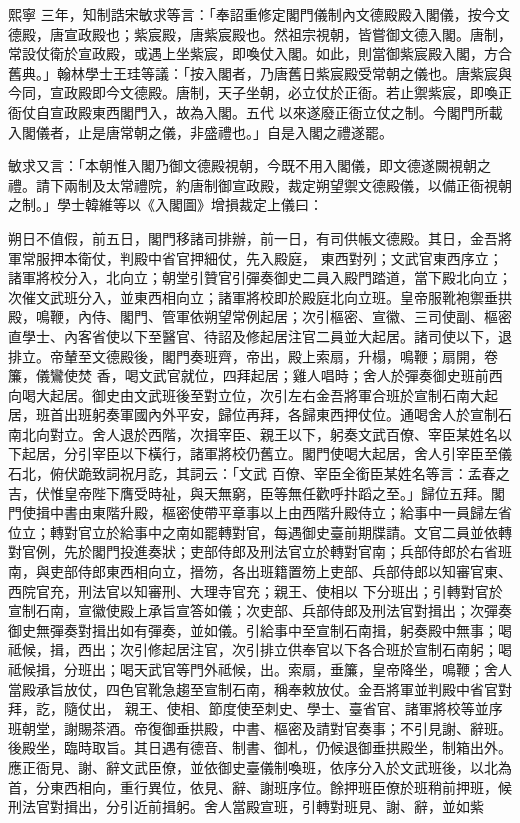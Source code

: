 \begin{pinyinscope}
 熙寧
 三年，知制誥宋敏求等言：「奉詔重修定閣門儀制內文德殿殿入閣儀，按今文德殿，唐宣政殿也；紫宸殿，唐紫宸殿也。然祖宗視朝，皆嘗御文德入閣。唐制，常設仗衛於宣政殿，或遇上坐紫宸，即喚仗入閣。如此，則當御紫宸殿入閣，方合舊典。」翰林學士王珪等議：「按入閣者，乃唐舊日紫宸殿受常朝之儀也。唐紫宸與今同，宣政殿即今文德殿。唐制，天子坐朝，必立仗於正衙。若止禦紫宸，即喚正衙仗自宣政殿東西閣門入，故為入閣。五代
 以來遂廢正衙立仗之制。今閣門所載入閣儀者，止是唐常朝之儀，非盛禮也。」自是入閣之禮遂罷。



 敏求又言：「本朝惟入閣乃御文德殿視朝，今既不用入閣儀，即文德遂闕視朝之禮。請下兩制及太常禮院，約唐制御宣政殿，裁定朔望禦文德殿儀，以備正衙視朝之制。」學士韓維等以《入閣圖》增損裁定上儀曰：



 朔日不值假，前五日，閣門移諸司排辦，前一日，有司供帳文德殿。其日，金吾將軍常服押本衛仗，判殿中省官押細仗，先入殿庭，
 東西對列；文武官東西序立；諸軍將校分入，北向立；朝堂引贊官引彈奏御史二員入殿門踏道，當下殿北向立；次催文武班分入，並東西相向立；諸軍將校即於殿庭北向立班。皇帝服靴袍禦垂拱殿，鳴鞭，內侍、閣門、管軍依朔望常例起居；次引樞密、宣徽、三司使副、樞密直學士、內客省使以下至醫官、待詔及修起居注官二員並大起居。諸司使以下，退排立。帝輦至文德殿後，閣門奏班齊，帝出，殿上索扇，升榻，鳴鞭；扇開，卷簾，儀鸞使焚
 香，喝文武官就位，四拜起居；雞人唱時；舍人於彈奏御史班前西向喝大起居。御史由文武班後至對立位，次引左右金吾將軍合班於宣制石南大起居，班首出班躬奏軍國內外平安，歸位再拜，各歸東西押仗位。通喝舍人於宣制石南北向對立。舍人退於西階，次揖宰臣、親王以下，躬奏文武百僚、宰臣某姓名以下起居，分引宰臣以下橫行，諸軍將校仍舊立。閣門使喝大起居，舍人引宰臣至儀石北，俯伏跪致詞祝月訖，其詞云：「文武
 百僚、宰臣全銜臣某姓名等言：孟春之吉，伏惟皇帝陛下膺受時祉，與天無窮，臣等無任歡呼抃蹈之至。」歸位五拜。閣門使揖中書由東階升殿，樞密使帶平章事以上由西階升殿侍立；給事中一員歸左省位立；轉對官立於給事中之南如罷轉對官，每遇御史臺前期牒請。文官二員並依轉對官例，先於閣門投進奏狀；吏部侍郎及刑法官立於轉對官南；兵部侍郎於右省班南，與吏部侍郎東西相向立，搢笏，各出班籍置笏上吏部、兵部侍郎以知審官東、西院官充，刑法官以知審刑、大理寺官充；親王、使相以
 下分班出；引轉對官於宣制石南，宣徽使殿上承旨宣答如儀；次吏部、兵部侍郎及刑法官對揖出；次彈奏御史無彈奏對揖出如有彈奏，並如儀。引給事中至宣制石南揖，躬奏殿中無事；喝祗候，揖，西出；次引修起居注官，次引排立供奉官以下各合班於宣制石南躬；喝祗候揖，分班出；喝天武官等門外祗候，出。索扇，垂簾，皇帝降坐，鳴鞭；舍人當殿承旨放仗，四色官靴急趨至宣制石南，稱奉敕放仗。金吾將軍並判殿中省官對拜，訖，隨仗出，
 親王、使相、節度使至刺史、學士、臺省官、諸軍將校等並序班朝堂，謝賜茶酒。帝復御垂拱殿，中書、樞密及請對官奏事；不引見謝、辭班。後殿坐，臨時取旨。其日遇有德音、制書、御札，仍候退御垂拱殿坐，制箱出外。應正衙見、謝、辭文武臣僚，並依御史臺儀制喚班，依序分入於文武班後，以北為首，分東西相向，重行異位，依見、辭、謝班序位。餘押班臣僚於班稍前押班，候刑法官對揖出，分引近前揖躬。舍人當殿宣班，引轉對班見、謝、辭，並如紫

\end{pinyinscope}
